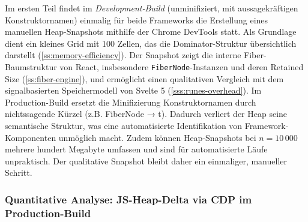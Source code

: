 Im ersten Teil findet im \textit{Development-Build} (unminifiziert, mit aussagekräftigen Konstruktornamen) einmalig für beide Frameworks die Erstellung eines manuellen Heap-Snapshots mithilfe der Chrome DevTools statt. Als Grundlage dient ein kleines Grid mit 100 Zellen, das die Dominator-Struktur übersichtlich darstellt (\cref{ss:memory-efficiency}). Der Snapshot zeigt die interne Fiber-Baumstruktur von React, insbesondere \texttt{FiberNode}-Instanzen und deren Retained Size (\cref{ss:fiber-engine}), und ermöglicht einen qualitativen Vergleich mit dem signalbasierten Speichermodell von Svelte 5 (\cref{sss:runes-overhead}). Im Production-Build ersetzt die Minifizierung Konstruktornamen durch nichtssagende Kürzel (z.B. FiberNode → t). Dadurch verliert der Heap seine semantische Struktur, was eine automatisierte Identifikation von Framework-Komponenten unmöglich macht. Zudem können Heap-Snapshots bei $n = 10\,000$ mehrere hundert Megabyte umfassen und sind für automatisierte Läufe unpraktisch. Der qualitative Snapshot bleibt daher ein einmaliger, manueller Schritt.

\subsubsection{Quantitative Analyse: JS-Heap-Delta via CDP im Production-Build}
\label{sss:quantitative-heap}

